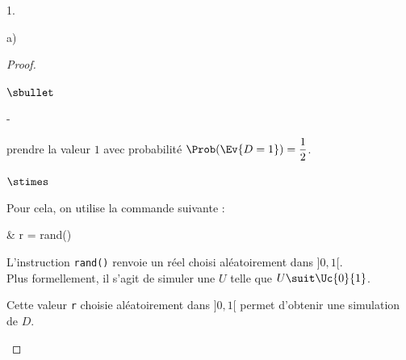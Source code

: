 \documentclass[11pt]{article}%
\begin{document}
\begin{noliste}{1.}
\begin{noliste}{a)}
\begin{proof}
\begin{noliste}{$\sbullet$}
\begin{liste}{-}
        \item prendre la valeur $1$ avec probabilité $\Prob(\Ev{D =1})
          = \dfrac{1}{2}$.
        \end{liste}
        \begin{noliste}{$\stimes$}
        \item Pour cela, on utilise la commande suivante :
          \begin{scilabC}{4}
            & \quad \quad r = rand()
          \end{scilabC}
          L'instruction {\tt rand()} renvoie un réel choisi
          aléatoirement dans $]0,1[$.\\
          Plus formellement, il s'agit de simuler une \var $U$ telle
          que $U \suit \Uc{0}{1}$.
          
        \item  Cette valeur {\tt r} choisie aléatoirement dans $]0,1[$
          permet d'obtenir une simulation de $D$.
          \begin{center}
            \shorthandoff{;}
\end{center}
\end{noliste}
\end{noliste}
\end{proof}
\end{noliste}
\end{noliste}
\end{document}
